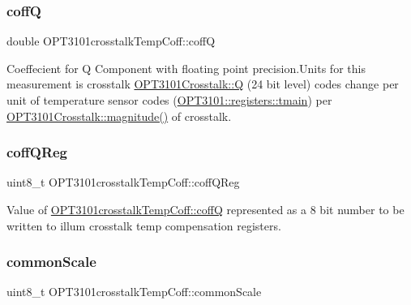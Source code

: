 \subsubsection{\texorpdfstring{coffQ}{coffQ}}
{\footnotesize\ttfamily double O\+P\+T3101crosstalk\+Temp\+Coff\+::coffQ}



Coeffecient for Q Component with floating point precision.\+Units for this measurement is crosstalk \mbox{\hyperlink{class_o_p_t3101_crosstalk_a0454e10774015dd2e941f9284ea516da}{O\+P\+T3101\+Crosstalk\+::Q}} (24 bit level) codes change per unit of temperature sensor codes (\mbox{\hyperlink{class_o_p_t3101_1_1registers_a3dfd8d81d4cb04d274007deb7c6122fc}{O\+P\+T3101\+::registers\+::tmain}}) per \mbox{\hyperlink{class_o_p_t3101_crosstalk_acb6217116c652bc7c0c84e7b86504f18}{O\+P\+T3101\+Crosstalk\+::magnitude()}} of crosstalk. 

\mbox{\label{class_o_p_t3101crosstalk_temp_coff_abe7525dd02d13dbbb4ea329b5dfa9250}} 
\subsubsection{\texorpdfstring{coff\+Q\+Reg}{coffQReg}}
{\footnotesize\ttfamily uint8\+\_\+t O\+P\+T3101crosstalk\+Temp\+Coff\+::coff\+Q\+Reg}



Value of \mbox{\hyperlink{class_o_p_t3101crosstalk_temp_coff_a6d2ce80b4e1936571777185f302305b5}{O\+P\+T3101crosstalk\+Temp\+Coff\+::coffQ}} represented as a 8 bit number to be written to illum crosstalk temp compensation registers. 

\mbox{\label{class_o_p_t3101crosstalk_temp_coff_a23ec6b8c3190fefad73d747864a0b10f}} 
\subsubsection{\texorpdfstring{common\+Scale}{commonScale}}
{\footnotesize\ttfamily uint8\+\_\+t O\+P\+T3101crosstalk\+Temp\+Coff\+::common\+Scale}



